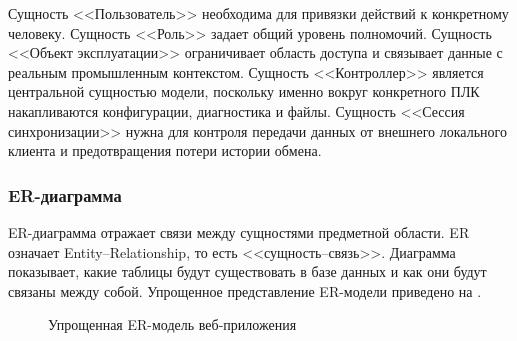 Сущность <<Пользователь>> необходима для привязки действий к конкретному
человеку. Сущность <<Роль>> задает общий уровень полномочий. Сущность <<Объект
эксплуатации>> ограничивает область доступа и связывает данные с реальным
промышленным контекстом. Сущность <<Контроллер>> является центральной сущностью
модели, поскольку именно вокруг конкретного ПЛК накапливаются конфигурации,
диагностика и файлы. Сущность <<Сессия синхронизации>> нужна для контроля
передачи данных от внешнего локального клиента и предотвращения потери истории
обмена.

\subsubsection{ER-диаграмма}

ER-диаграмма отражает связи между сущностями предметной области. ER означает
Entity--Relationship, то есть <<сущность--связь>>. Диаграмма показывает, какие
таблицы будут существовать в базе данных и как они будут связаны между собой.
Упрощенное представление ER-модели приведено на .

\begin{figure}[ht!]
    \centering
    \caption{Упрощенная ER-модель веб-приложения}
    \label{fig:er_model}
\end{figure}

